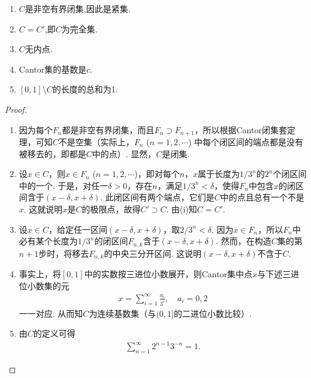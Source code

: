 \documentclass[../../main.tex]{subfiles}
\begin{document}
\begin{theorem}[Cantor集的基本性质]\label{theorem:Cantor集的基本性质}
\begin{enumerate}[(1)]
\item $C$是非空有界闭集,因此是紧集.

\item $C = C'$,即$C$为完全集.

\item $C$无内点.

\item Cantor集的基数是$c$.

\item $[0,1]\setminus C$的长度的总和为1.
\end{enumerate}
\end{theorem}
\begin{proof}
\begin{enumerate}[(1)]
\item 因为每个$F_n$都是非空有界闭集，而且$F_n\supset F_{n + 1}$，所以根据Cantor闭集套定理，可知$C$不是空集（实际上，$F_n$ ($n = 1,2,\cdots$) 中每个闭区间的端点都是没有被移去的，即都是$C$中的点）. 显然，$C$是闭集.

\item 设$x\in C$，则$x\in F_n$ ($n = 1,2,\cdots$)，即对每个$n$，$x$属于长度为$1/3^n$的$2^n$个闭区间中的一个. 于是，对任一$\delta>0$，存在$n$，满足$1/3^n<\delta$，使得$F_n$中包含$x$的闭区间含于$(x - \delta, x + \delta)$. 此闭区间有两个端点，它们是$C$中的点且总有一个不是$x$. 这就说明$x$是$C$的极限点，故得$C'\supset C$. 由(i)知$C = C'$.

\item 设$x\in C$，给定任一区间$(x - \delta, x + \delta)$，取$2/3^n<\delta$. 因为$x\in F_n$，所以$F_n$中必有某个长度为$1/3^n$的闭区间$F_{n,k}$含于$(x - \delta, x + \delta)$. 然而，在构造$C$集的第$n + 1$步时，将移去$F_{n,k}$的中央三分开区间. 这说明$(x - \delta, x + \delta)$不含于$C$.

\item 事实上，将$[0,1]$中的实数按三进位小数展开，则Cantor集中点$x$与下述三进位小数集的元
\begin{align*}
x=\sum_{i = 1}^{\infty}\frac{a_i}{3^i}, \quad a_i = 0,2
\end{align*}
一一对应. 从而知$C$为连续基数集（与$(0,1]$的二进位小数比较）. 

\item 由$C$的定义可得
\begin{align*}
\sum_{n = 1}^{\infty}2^{n - 1}3^{-n}=1.
\end{align*}
\end{enumerate}
\end{proof}
\end{document}
